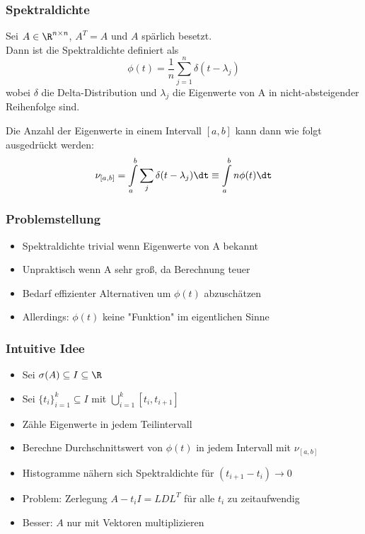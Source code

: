 \begin{frame}
    \frametitle{Spektraldichte}
    \pause
    \begin{definition} [Spektraldichte]
        Sei $A \in \R^{n \times n}$, $A^T = A$ und $A$ spärlich besetzt.\\
        Dann ist die Spektraldichte definiert als 
        $$\phi(t) = \frac{1}{n} \sum_{j=1}^{n} \delta(t - \lambda_j)$$
    wobei $\delta$ die Delta-Distribution und $\lambda_j$ die Eigenwerte von A in nicht-absteigender Reihenfolge sind.\\
    \end{definition}
    \pause
    Die Anzahl der Eigenwerte in einem Intervall $[a, b]$ kann dann wie folgt ausgedrückt werden:
    $$\nu_{[a, b]} = \int\limits_a^b \sum_j \delta(t - \lambda_j) \dt \equiv \int\limits_a^b n \phi(t) \dt$$
\end{frame}

\begin{frame}
    \frametitle{Problemstellung}
    \begin{itemize}
        \pause
        \item Spektraldichte trivial wenn Eigenwerte von A bekannt
        \pause
        \item Unpraktisch wenn A sehr groß, da Berechnung teuer
        \pause
        \item Bedarf effizienter Alternativen um $\phi(t)$ abzuschätzen
        \pause
        \item Allerdings: $\phi(t)$ keine "Funktion" im eigentlichen Sinne
    \end{itemize}
\end{frame}

\begin{frame}
    \frametitle{Intuitive Idee}
    \begin{itemize}
        \pause
        \item Sei $\sigma(A) \subseteq I \subseteq \R$
        \pause
        \item Sei $\{t_i\}_{i = 1}^k \subseteq I$ mit $\bigcup_{i = 1}^k [t_i, t_{i+1}]$
        \pause
        \item Zähle Eigenwerte in jedem Teilintervall
        \pause
        \item Berechne Durchschnittswert von $\phi(t)$ in jedem Intervall mit $\nu_{[a, b]}$
        \pause
        \item Histogramme nähern sich Spektraldichte für $(t_{i+1} - t_i) \longrightarrow 0$
        \pause
        \item Problem: Zerlegung $A - t_i I = LDL^T$ für alle $t_i$ zu zeitaufwendig
        \pause
        \item Besser: $A$ nur mit Vektoren multiplizieren
    \end{itemize}
\end{frame}